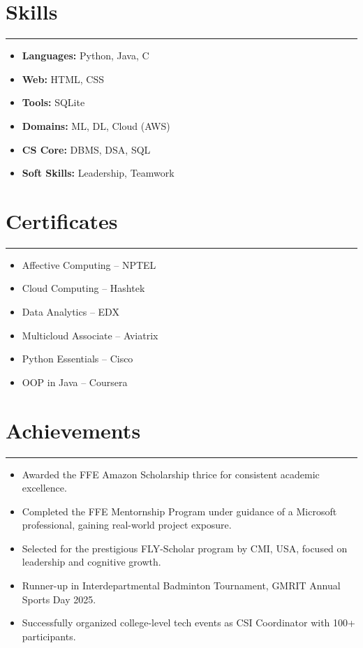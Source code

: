 \documentclass[a4paper,9pt]{article}
\newcommand{\resumesection}[1]{%
  \vspace{6pt}
  \section*{#1}
  \hrule\vspace{4pt}
}
\begin{document}
\resumesection{Skills}
\noindent\begin{minipage}{\textwidth}
\begin{multicols}{2}
\begin{itemize}[leftmargin=*, noitemsep]
    \item \textbf{Languages:} Python, Java, C
    \item \textbf{Web:} HTML, CSS
    \item \textbf{Tools:} SQLite
    \item \textbf{Domains:} ML, DL, Cloud (AWS)
    \item \textbf{CS Core:} DBMS, DSA, SQL
    \item \textbf{Soft Skills:} Leadership, Teamwork
\end{itemize}
\end{multicols}
\end{minipage}

\resumesection{Certificates}
\noindent\begin{minipage}{\textwidth}
\begin{multicols}{2}
\begin{itemize}[leftmargin=*, noitemsep]
    \item Affective Computing – NPTEL
    \item Cloud Computing – Hashtek
    \item Data Analytics – EDX
    \item Multicloud Associate – Aviatrix
    \item Python Essentials – Cisco
    \item OOP in Java – Coursera
\end{itemize}
\end{multicols}
\end{minipage}

\resumesection{Achievements}
\begin{itemize}[leftmargin=*, noitemsep]
    \item Awarded the FFE Amazon Scholarship thrice for consistent academic excellence.
    \item Completed the FFE Mentornship Program under guidance of a Microsoft professional, gaining real-world project exposure.
    \item Selected for the prestigious FLY-Scholar program by CMI, USA, focused on leadership and cognitive growth.
    \item Runner-up in Interdepartmental Badminton Tournament, GMRIT Annual Sports Day 2025.
    \item Successfully organized college-level tech events as CSI Coordinator with 100+ participants.
\end{itemize}
\end{document}
